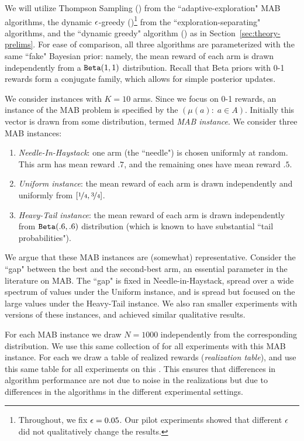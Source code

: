 \documentclass[../competing_bandits.tex]{subfiles}
\begin{document}
We will utilize Thompson Sampling (\TS) from the ``adaptive-exploration" MAB algorithms, the dynamic $\epsilon$-greedy (\DEG)\footnote{Throughout, we fix $\epsilon = 0.05$. Our pilot experiments showed that different $\epsilon$ did not qualitatively change the results.} from the ``exploration-separating" algorithms, and the ``dynamic greedy" algorithm (\DG) as in Section~\ref{sec:theory-prelims}. For ease of comparison, all three algorithms are parameterized with the same ``fake" Bayesian prior: namely, the mean reward of each arm is drawn independently from a $\mathtt{Beta}(1,1)$ distribution. Recall that Beta priors with 0-1 rewards form a conjugate family, which allows for simple posterior updates.


We consider instances with $K=10$ arms. Since we focus on 0-1 rewards, an instance of the MAB problem is specified by the \emph{\MRV} $(\mu(a):\; a\in A)$. Initially this vector is drawn from some distribution, termed \emph{MAB instance}. We consider three MAB instances:
\begin{enumerate}
\item \emph{Needle-In-Haystack}: one arm (the ``needle") is chosen uniformly at random. This arm has mean reward $.7$, and the remaining ones have mean reward $.5$.

\item \emph{Uniform instance}: the mean reward of each arm is drawn independently and uniformly from $[\nicefrac{1}{4}, \nicefrac{3}{4}]$.
\item \emph{Heavy-Tail instance}: the mean reward of each arm is drawn independently from $\mathtt{Beta}(.6,.6)$ distribution (which is known to have substantial ``tail probabilities").
\end{enumerate}
We argue that these MAB instances are (somewhat) representative. Consider the ``gap" between the best and the second-best arm, an essential parameter in the literature on MAB. The ``gap" is fixed in Needle-in-Haystack, spread over a wide spectrum of values under the Uniform instance, and is spread but  focused on the large values under the Heavy-Tail instance. We also ran smaller experiments with versions of these instances, and achieved similar qualitative results.

For each MAB instance we draw $N = 1000$ \MRVs independently from the corresponding distribution. We use this same collection of \MRVs for all experiments with this MAB instance. For each \MRV we draw a table of realized rewards (\emph{realization table}), and use this same table for all experiments on this \MRV. This ensures that differences in algorithm performance are not due to noise in the realizations but due to differences in the algorithms in the different experimental settings.
\end{document}
